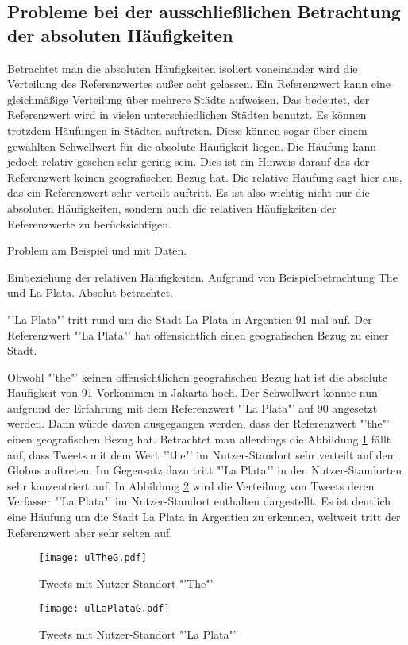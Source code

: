 		\subsection{Probleme bei der ausschließlichen Betrachtung der absoluten Häufigkeiten} 

			Betrachtet man die absoluten Häufigkeiten isoliert voneinander wird die Verteilung des Referenzwertes außer acht gelassen. 
			Ein Referenzwert kann eine gleichmäßige Verteilung über mehrere Städte aufweisen.
			Das bedeutet, der Referenzwert wird in vielen unterschiedlichen Städten benutzt. 
			Es können trotzdem Häufungen in Städten auftreten.
			Diese können sogar über einem gewählten Schwellwert für die absolute Häufigkeit liegen.
			Die Häufung kann jedoch relativ gesehen sehr gering sein.
			Dies ist ein Hinweis darauf das der Referenzwert keinen geografischen Bezug hat.
			Die relative Häufung sagt hier aus, das ein Referenzwert sehr verteilt auftritt. 
			Es ist also wichtig nicht nur die absoluten Häufigkeiten, sondern auch die relativen Häufigkeiten der Referenzwerte zu berücksichtigen.

			Problem am Beispiel und mit Daten.

			Einbeziehung der relativen Häufigkeiten. 
			Aufgrund von Beispielbetrachtung The und La Plata. Absolut betrachtet.


			"'La Plata"' tritt rund um die Stadt La Plata in Argentien 91 mal auf.
			Der Referenzwert "'La Plata"' hat offensichtlich einen geografischen Bezug zu einer Stadt. 

			Obwohl "'the"' keinen offensichtlichen geografischen Bezug hat ist die absolute Häufigkeit von 91 Vorkommen in Jakarta hoch.
			Der Schwellwert könnte nun aufgrund der Erfahrung mit dem Referenzwert "'La Plata"' auf 90 angesetzt werden.
			Dann würde davon ausgegangen werden, dass der Referenzwert "'the"' einen geografischen Bezug hat.
			Betrachtet man allerdings die Abbildung \ref{img:ULThe} fällt auf, dass Tweets mit dem Wert "'the"' im Nutzer-Standort sehr verteilt auf dem Globus auftreten.
			Im Gegensatz dazu tritt "'La Plata"' in den Nutzer-Standorten sehr konzentriert auf.
			In Abbildung \ref{img:ULlaPlata} wird die Verteilung von Tweets deren Verfasser "'La Plata"' im Nutzer-Standort enthalten dargestellt. 
			Es ist deutlich eine Häufung um die Stadt La Plata in Argentien zu erkennen, weltweit tritt der Referenzwert aber sehr selten auf.
			\begin{figure} 
				\begin{center}
					\texttt{[image: ulTheG.pdf]}
					\caption{Tweets mit Nutzer-Standort "'The"'}
					\label{img:ULThe}
					\end{center}
				\end{figure}
			\begin{figure}
			\begin{center}
					\texttt{[image: ulLaPlataG.pdf]}
					\caption{Tweets mit Nutzer-Standort "'La Plata"'}
					\label{img:ULlaPlata}
				\end{center}
			\end{figure}		

